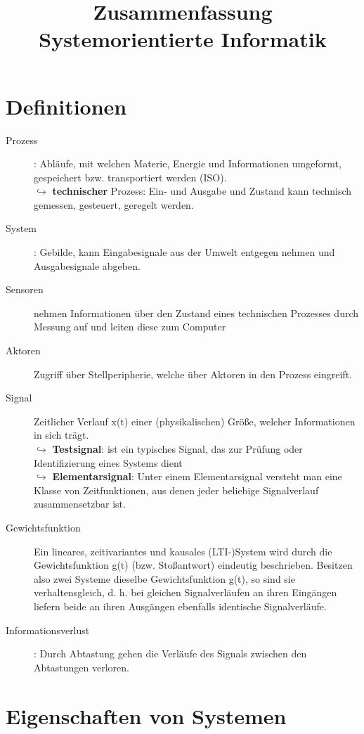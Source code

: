 \documentclass[a4paper, 11pt]{scrartcl}
\title{Zusammenfassung Systemorientierte Informatik}
\theoremstyle{definition}
\begin{document}
\section{Definitionen}
\begin{description}
    \item[Prozess]: Abläufe, mit welchen Materie, Energie und Informationen umgeformt, gespeichert bzw. transportiert werden (ISO).\\
        $\hookrightarrow$ \textbf{technischer} Prozess:  Ein- und Ausgabe und Zustand kann technisch gemessen, gesteuert, geregelt werden.
    \item[System]: Gebilde, kann Eingabesignale aus der Umwelt entgegen nehmen und Ausgabesignale abgeben.
    \item[Sensoren] nehmen   Informationen   über   den   Zustand   eines   technischen   Prozesses   durch Messung  auf  und  leiten  diese  zum Computer
    \item[Aktoren] Zugriff über Stellperipherie, welche über Aktoren in den Prozess eingreift. 
    \item[Signal] Zeitlicher  Verlauf x(t)  einer  (physikalischen) Größe, welcher Informationen in sich trägt.\\
    	$\hookrightarrow$ \textbf{Testsignal}: ist   ein   typisches   Signal,   das   zur   Prüfung   oder Identifizierung eines Systems dient \\
    	$\hookrightarrow$ \textbf{Elementarsignal}: Unter einem Elementarsignal versteht man eine Klasse von Zeitfunktionen, aus   denen   jeder   beliebige   Signalverlauf   zusammensetzbar   ist.
    \item[Gewichtsfunktion] Ein   lineares,   zeitivariantes und   kausales (LTI-)System   wird durch   die Gewichtsfunktion g(t) (bzw. Stoßantwort) eindeutig beschrieben. Besitzen also zwei Systeme dieselbe Gewichtsfunktion g(t), so sind sie verhaltensgleich, d. h. bei gleichen Signalverläufen an ihren Eingängen liefern beide an ihren Ausgängen ebenfalls identische Signalverläufe.
    \item[Informationsverlust]: Durch Abtastung gehen die Verläufe des Signals zwischen den Abtastungen verloren.
    
\end{description}

\section{Eigenschaften von Systemen}
\end{document}
